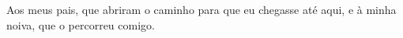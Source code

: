 \begin{dedicatoria}
  \vspace*{\fill}
  \begin{flushright}
    \begin{minipage}{0.5\textwidth}
      Aos meus pais, que abriram o caminho para que eu chegasse até aqui,
      e à minha noiva, que o percorreu comigo.
    \end{minipage}
  \end{flushright}
\end{dedicatoria}
